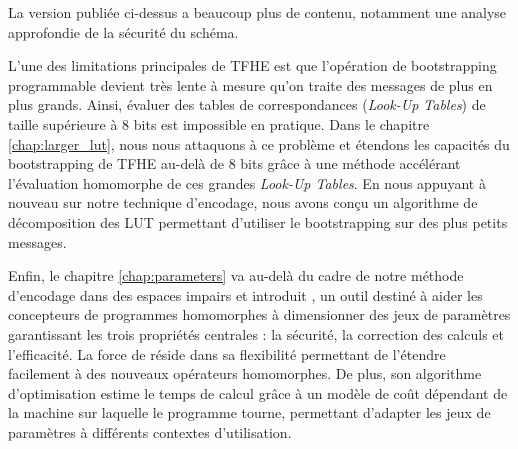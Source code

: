La version publiée ci-dessus a beaucoup plus de contenu, notamment une analyse approfondie de la sécurité du schéma.


L'une des limitations principales de TFHE est que l'opération de bootstrapping programmable devient très lente à mesure qu'on traite des messages de plus en plus grands. Ainsi, évaluer des tables de correspondances (\textit{Look-Up Tables}) de taille supérieure à 8 bits est impossible en pratique.  Dans le chapitre \ref{chap:larger_lut}, nous nous attaquons à ce problème et étendons les capacités du bootstrapping de TFHE au-delà de 8 bits grâce à une méthode accélérant l’évaluation homomorphe de ces grandes \textit{Look-Up Tables}. En nous appuyant à nouveau sur notre technique d'encodage, nous avons conçu un algorithme de décomposition des LUT permettant d'utiliser le bootstrapping sur des plus petits messages. 



Enfin, le chapitre \ref{chap:parameters} va au-delà du cadre de notre méthode d'encodage dans des espaces impairs et introduit \toolName, un outil destiné à aider les concepteurs de programmes homomorphes à dimensionner des jeux de paramètres garantissant les trois propriétés centrales : la sécurité, la correction des calculs et l’efficacité. La force de \toolName réside dans sa flexibilité permettant de l'étendre facilement à des nouveaux opérateurs homomorphes. De plus, son algorithme d'optimisation estime le temps de calcul grâce à un modèle de coût dépendant de la machine sur laquelle le programme tourne, permettant d'adapter les jeux de paramètres à différents contextes d'utilisation.


